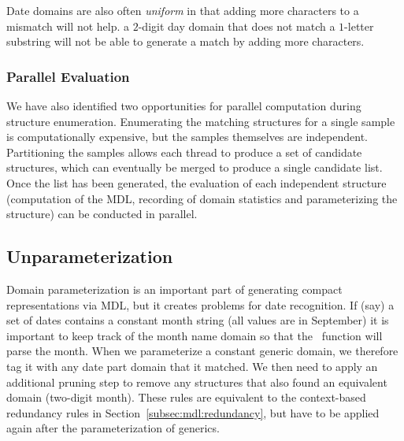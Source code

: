 Date domains are also often \emph{uniform} in that adding more characters to a mismatch will not help. \eg a $2$-digit day domain that does not match a $1$-letter substring will not be able to generate a match by adding more characters.

\subsubsection{Parallel Evaluation}
We have also identified two opportunities for parallel computation during structure enumeration.
Enumerating the matching structures for a single sample is computationally expensive, but the samples themselves are independent. 
Partitioning the samples allows each thread to produce a set of candidate structures, which can eventually be merged to produce a single candidate list.
Once the list has been generated, the evaluation of each independent structure (computation of the MDL, recording of domain statistics and parameterizing the structure) can be conducted in parallel.

\subsection{Unparameterization}
Domain parameterization is an important part of generating compact representations via MDL, but it creates problems for date recognition. 
If (say) a set of dates contains a constant month string (\eg all values are in September) it is important to keep track of the month name domain
so that the \dateparse\ function will parse the month.
When we parameterize a constant generic  domain, we therefore tag it with any date part domain that it matched. 
We then need to apply an additional pruning step to remove any structures that also found an equivalent domain (\eg two-digit month). 
These rules are equivalent to the context-based redundancy rules in Section~\ref{subsec:mdl:redundancy}, but have to be applied again after the parameterization of generics.

